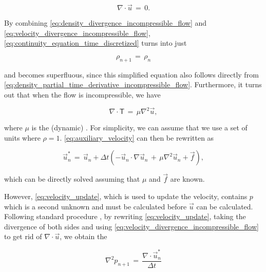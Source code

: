 \begin{equation} \label{eq:velocity_divergence_incompressible_flow}
\nabla\cdot\vec{u} \,=\, 0.
\end{equation}

By combining \eqref{eq:density_divergence_incompressible_flow} and \eqref{eq:velocity_divergence_incompressible_flow}, \eqref{eq:continuity_equation_time_discretized} turns into just

\begin{equation} \label{eq:continuity_equation_superfluous}
{\rho_{n+1} \,=\, \rho_n}
\end{equation}

and becomes superfluous, since this simplified equation also follows directly from \eqref{eq:density_partial_time_derivative_incompressible_flow}. Furthermore, it turns out that when the flow is incompressible, we have

\begin{equation} \label{eq:deviatoric_stress_tensor_incompressible_flow}
\nabla\cdot\boldsymbol{\mathsf{T}} \,=\, \mu\nabla^2\vec{u},
\end{equation}

where $\mu$ is the (dynamic) \viscosity. For simplicity, we can assume that we use a set of units where $\rho = 1$. \eqref{eq:auxiliary_velocity} can then be rewritten as

\begin{equation} \label{eq:auxiliary_velocity_reduced}
\vec{u}^*_n \,= \, \vec{u}_{n} + \Delta t(- \vec{u}_{n}\cdot\nabla\vec{u}_{n} \,+\, \mu\nabla^2\vec{u}_{n} + \vec{f}),
\end{equation}

which can be directly solved assuming that $\mu$ and $\vec{f}$ are known.

However, \eqref{eq:velocity_update}, which is used to update the velocity, contains $p$ which is a second unknown and must be calculated before $\vec{u}$ can be calculated. Following standard procedure \citep{Losasso2004}, by rewriting \eqref{eq:velocity_update}, taking the divergence of both sides and using \eqref{eq:velocity_divergence_incompressible_flow} to get rid of $\nabla\cdot\vec{u}$, we obtain the 

\begin{equation} \label{eq:pressure_poisson_equation_incompressible_flow}
\nabla^2 p_{n+1} \,=\, \frac{\nabla\cdot\vec{u}^*_n}{\Delta t}
\end{equation}

